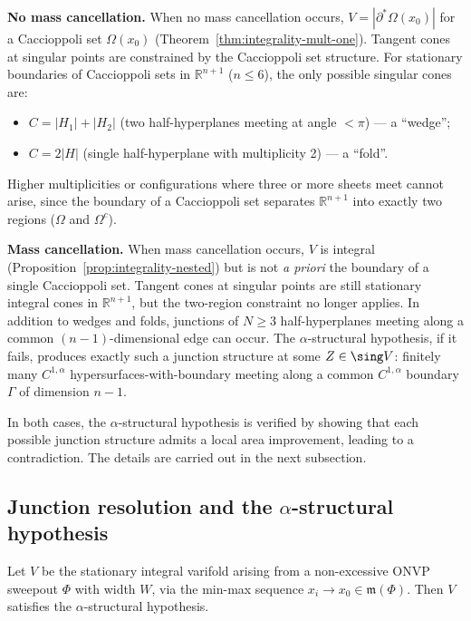\medskip\noindent\textbf{No mass cancellation.}
When no mass cancellation occurs, $V = |\partial^*\Omega(x_0)|$ for a Caccioppoli set $\Omega(x_0)$ (Theorem~\ref{thm:integrality-mult-one}). Tangent cones at singular points are constrained by the Caccioppoli set structure. For stationary boundaries of Caccioppoli sets in $\mathbb{R}^{n+1}$ ($n \leq 6$), the only possible singular cones are:
\begin{itemize}
    \item $C = |H_1| + |H_2|$ (two half-hyperplanes meeting at angle $< \pi$) --- a ``wedge'';
    \item $C = 2|H|$ (single half-hyperplane with multiplicity 2) --- a ``fold''.
\end{itemize}
Higher multiplicities or configurations where three or more sheets meet cannot arise, since the boundary of a Caccioppoli set separates $\mathbb{R}^{n+1}$ into exactly two regions ($\Omega$ and $\Omega^c$).

\medskip\noindent\textbf{Mass cancellation.}
When mass cancellation occurs, $V$ is integral (Proposition~\ref{prop:integrality-nested}) but is not \emph{a priori} the boundary of a single Caccioppoli set. Tangent cones at singular points are still stationary integral cones in $\mathbb{R}^{n+1}$, but the two-region constraint no longer applies. In addition to wedges and folds, junctions of $N \geq 3$ half-hyperplanes meeting along a common $(n-1)$-dimensional edge can occur. The $\alpha$-structural hypothesis, if it fails, produces exactly such a junction structure at some $Z \in \sing V$: finitely many $C^{1,\alpha}$ hypersurfaces-with-boundary meeting along a common $C^{1,\alpha}$ boundary $\Gamma$ of dimension $n - 1$.

In both cases, the $\alpha$-structural hypothesis is verified by showing that each possible junction structure admits a local area improvement, leading to a contradiction. The details are carried out in the next subsection.

\subsection{Junction resolution and the $\alpha$-structural hypothesis}\label{subsec:junction-resolution}

\begin{theorem}\label{thm:alpha-hypo}
    Let $V$ be the stationary integral varifold arising from a non-excessive ONVP sweepout $\Phi$
    with width $W$, via the min-max sequence $x_i \to x_0 \in \mathfrak{m}(\Phi)$. Then $V$ satisfies the $\alpha$-structural hypothesis.
\end{theorem}

